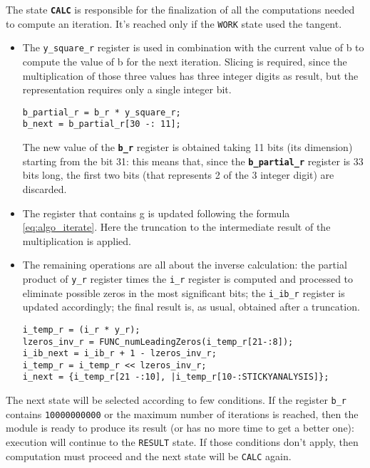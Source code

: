 \documentclass[paper=letter, fontsize=12pt]{article}
\begin{document}
The state \textbf\texttt{CALC} is responsible for the finalization of all the computations needed to compute an iteration. It's reached only if the \texttt{WORK} state used the tangent.
    \begin{itemize}
    \item The \texttt{y\_square\_r} register is used in combination with the current value of b to compute the value of b for the next iteration. Slicing is required, since the multiplication of those three values has three integer digits as result, but the representation requires only a single integer bit.
\begin{lstlisting}
b_partial_r = b_r * y_square_r;
b_next = b_partial_r[30 -: 11];
\end{lstlisting}
    The new value of the \textbf\texttt{b\_r} register is obtained taking 11 bits (its dimension) starting from the bit 31: this means that, since the \textbf\texttt{b\_partial\_r} register is 33 bits long, the first two bits (that represents 2 of the 3 integer digit) are discarded. 
    \item The register that contains g is updated following the formula \ref{eq:algo_iterate}. Here the truncation to the intermediate result of the multiplication is applied.
    \item The remaining operations are all about the inverse calculation: the partial product of \texttt{y\_r} register times the \texttt{i\_r} register is computed and processed to eliminate possible zeros in the most significant bits; the \texttt{i\_ib\_r} register is updated accordingly; the final result is, as usual, obtained after a truncation.
\begin{lstlisting}
i_temp_r = (i_r * y_r);
lzeros_inv_r = FUNC_numLeadingZeros(i_temp_r[21-:8]);
i_ib_next = i_ib_r + 1 - lzeros_inv_r;
i_temp_r = i_temp_r << lzeros_inv_r;
i_next = {i_temp_r[21 -:10], |i_temp_r[10-:STICKYANALYSIS]};
\end{lstlisting}
    \end{itemize}
The next state will be selected according to few conditions. If the register \texttt{b\_r} contains \texttt{10000000000} or the maximum number of iterations is reached, then the module is ready to produce its result (or has no more time to get a better one): execution will continue to the \texttt{RESULT} state. If those conditions don't apply, then computation must proceed and the next state will be \texttt{CALC} again.
\end{document}

